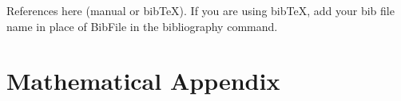 \documentclass[AEJ]{AEA}
\begin{document}
References here (manual or bibTeX). If you are using bibTeX, add your bib file 
name in place of BibFile in the bibliography command.

\printbibliography[title={Whole bibliography}]


\appendix
\section{Mathematical Appendix}
\end{document}
